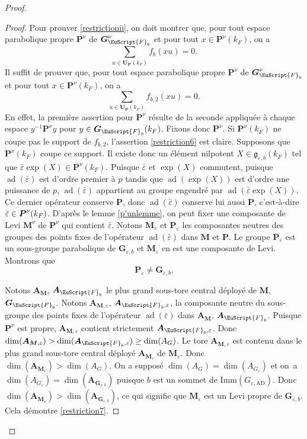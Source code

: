 \documentclass[JEP,XML,SOM,Unicode,francais]{cedram}
\let\mathcal \EuScript
\let\epsilon\varepsilon
\newcommand{\frg}{\mathfrak{g}}
\newcommand{\AD}{\mathrm{AD}}
\newcommand{\Imm}{\mathrm{Imm}}
\DeclareMathOperator{\ad}{ad}
\newcommand{\bA}{\boldsymbol{A}}
\newcommand{\bG}{\boldsymbol{G}}
\newcommand{\bM}{\boldsymbol{M}}
\newcommand{\bP}{\boldsymbol{P}}
\newcommand{\bU}{\boldsymbol{U}}
\newcommand{\cF}{\mathcal{F}}
\theoremstyle{plain}
\theoremstyle{definition}
\begin{document}
\begin{proof}
\begin{proof}
Pour prouver \eqref{restrictionii}, on doit montrer que, pour tout espace parabolique propre $\bP^{\nu}$ de $\bG_{\cF_{b}}^{\nu}$ et pour tout $x\in \bP^{\nu}(k_{F})$, on a
\[
\sum_{u\in \bU_{\bP}(k_{F})}f_{b}(xu)=0.
\]
Il suffit de prouver que, pour tout espace parabolique propre $\bP^{\nu}$ de $\bG_{\cF_{b}}^{\nu}$ et pour tout $x\in \bP^{\nu}(k_{F})$, on a
\begin{equation}\tag{6}\label{restriction6}
\sum_{u\in \bU_{\bP}(k_{F})}f_{b,2}(xu)=0.
\end{equation}
En effet, la première assertion pour $\bP^{\nu}$ résulte de la seconde appliquée à chaque espace $y^{-1}\bP^{\nu}y$ pour $y\in \bG_{\cF_{b}}(k_{F})$. Fixons donc $\bP^{\nu}$. Si $\bP^{\nu}(k_{F})$ ne coupe pas le support de $f_{b,2}$, l'assertion \eqref{restriction6} est claire. Supposons que $\bP^{\nu}(k_{F})$ coupe ce support. Il existe donc un élément nilpotent $X\in \boldsymbol{\frg}_{\epsilon,b}(k_{F})$ tel que $\bar{\epsilon}\exp(X)\in \bP^{\nu}(k_{F})$. Puisque $\bar{\epsilon}$ et $\exp(X)$ commutent, puisque $\ad(\bar{\epsilon})$ est d'ordre premier à $p$ tandis que $\ad(\exp(X))$ est d'ordre une puissance de $p$, $\ad(\bar{\epsilon})$ appartient au groupe engendré par $\ad(\bar{\epsilon}\exp(X))$. Ce dernier opérateur conserve $\bP$, donc $\ad(\bar{\epsilon})$ conserve lui aussi $\bP$, c'est-à-dire $\bar{\epsilon}\in\nobreak \bP^{\nu}(k_{F})$. D'après le lemme \ref{p'unlemme}, on peut fixer une composante de Levi $\bM^{\nu}$ de $\bP^{\nu}$ qui contient $\bar{\epsilon}$. Notons $\bM_{\epsilon}$ et $\bP_{\epsilon}$ les composantes neutres des groupes des points fixes de l'opérateur $\ad(\bar{\epsilon})$ dans $\bM$ et $\bP$. Le groupe $\bP_{\epsilon}$ est un sous-groupe parabolique de $\bG_{\epsilon,b}$ et $\bM_{\epsilon}$ en est une composante de Levi. Montrons que
\begin{equation}\tag{7}\label{restriction7}
\bP_{\epsilon}\neq\bG_{\epsilon,b}.
\end{equation}

Notons $\bA_{\bM}$, \resp $\bA_{\cF_{b}}$ le plus grand sous-tore central déployé de $\bM$, \resp $\bG_{\cF_{b}}$. Notons $\bA_{\bM,\epsilon}$, \resp $\bA_{\cF_{b},\epsilon}$, la composante neutre du sous-groupe des points fixes de l'opérateur $\ad(\bar{\epsilon})$ dans $\bA_{\bM}$, \resp $\bA_{\cF_{b}}$. Puisque $\bP^{\nu}$ est propre, $\bA_{\bM,\epsilon}$ contient strictement $\bA_{\cF_{b},\epsilon}$. Donc $\dim(\bA_{\bM,\epsilon})>\dim(\bA_{\cF_{b},\epsilon})\geq \dim(A_{G})$. Le tore $\bA_{\bM,\epsilon}$ est contenu dans le plus grand sous-tore central déployé $\bA_{\bM_{\epsilon}}$ de $\bM_{\epsilon}$. Donc $\dim(\bA_{\bM_{\epsilon}})> \dim(A_{G})$. On a supposé $\dim(A_{G})=\dim(A_{G_{\epsilon}})$ et on~a $\dim(A_{G_{\epsilon}})=\dim(\bA_{\bG_{\epsilon,b}})$ puisque $b$ est un sommet de $\Imm(G_{\epsilon,\AD})$. Donc $\dim(\bA_{\bM_{\epsilon}})> \dim(\bA_{\bG_{\epsilon,b}})$, ce qui signifie que $\bM_{\epsilon}$ est un Levi propre de $\bG_{\epsilon,b}$. Cela démontre \eqref{restriction7}.


\end{proof}
\end{proof}
\end{document}
